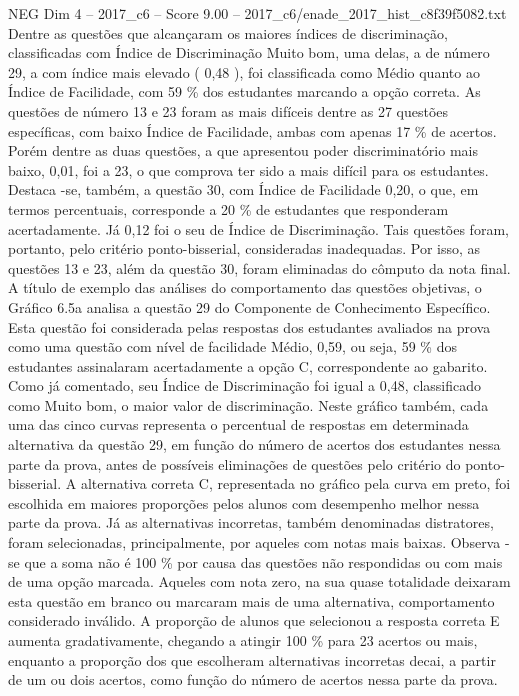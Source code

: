 \begin{textsample}{NEG Dim 4 – 2017\_c6 – Score 9.00 – 2017\_c6/enade\_2017\_hist\_c8f39f5082.txt}
Dentre as questões que alcançaram os maiores índices de discriminação, classificadas com Índice de Discriminação Muito bom, uma delas, a de número 29, a com índice mais elevado ( 0,48 ), foi classificada como Médio quanto ao Índice de Facilidade, com 59 \% dos estudantes marcando a opção correta.
As questões de número 13 e 23 foram as mais difíceis dentre as 27 questões específicas, com baixo Índice de Facilidade, ambas com apenas 17 \% de acertos.
Porém dentre as duas questões, a que apresentou poder discriminatório mais baixo, 0,01, foi a 23, o que comprova ter sido a mais difícil para os estudantes.
Destaca -se, também, a questão 30, com Índice de Facilidade 0,20, o que, em termos percentuais, corresponde a 20 \% de estudantes que responderam acertadamente.
Já 0,12 foi o seu de Índice de Discriminação.
Tais questões foram, portanto, pelo critério ponto-bisserial, consideradas inadequadas.
Por isso, as questões 13 e 23, além da questão 30, foram eliminadas do cômputo da nota final.
A título de exemplo das análises do comportamento das questões objetivas, o Gráfico 6.5a analisa a questão 29 do Componente de Conhecimento Específico.
Esta questão foi considerada pelas respostas dos estudantes avaliados na prova como uma questão com nível de facilidade Médio, 0,59, ou seja, 59 \% dos estudantes assinalaram acertadamente a opção C, correspondente ao gabarito.
Como já comentado, seu Índice de Discriminação foi igual a 0,48, classificado como Muito bom, o maior valor de discriminação.
Neste gráfico também, cada uma das cinco curvas representa o percentual de respostas em determinada alternativa da questão 29, em função do número de acertos dos estudantes nessa parte da prova, antes de possíveis eliminações de questões pelo critério do ponto-bisserial.
A alternativa correta C, representada no gráfico pela curva em preto, foi escolhida em maiores proporções pelos alunos com desempenho melhor nessa parte da prova.
Já as alternativas incorretas, também denominadas distratores, foram selecionadas, principalmente, por aqueles com notas mais baixas.
Observa -se que a soma não é 100 \% por causa das questões não respondidas ou com mais de uma opção marcada.
Aqueles com nota zero, na sua quase totalidade deixaram esta questão em branco ou marcaram mais de uma alternativa, comportamento considerado inválido.
A proporção de alunos que selecionou a resposta correta E aumenta gradativamente, chegando a atingir 100 \% para 23 acertos ou mais, enquanto a proporção dos que escolheram alternativas incorretas decai, a partir de um ou dois acertos, como função do número de acertos nessa parte da prova.

\end{textsample}
